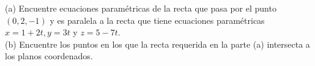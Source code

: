 \item (a) Encuentre ecuaciones paramétricas de la recta que pasa por el punto $(0, 2, -1)$ y es paralela a la recta que tiene ecuaciones paramétricas $x = 1 + 2t, y = 3t$ y $z = 5 - 7t$. \\
    (b) Encuentre los puntos en los que la recta requerida en la parte (a) intersecta a los planos coordenados.
